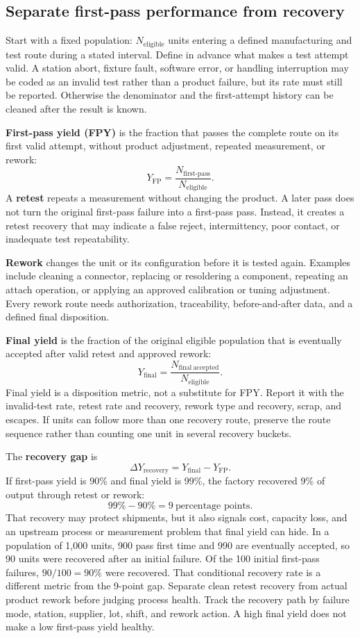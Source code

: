 \subsection{Separate first-pass performance from recovery}
\label{sec:yield-recovery-accounting}

Start with a fixed population: \(N_{\mathrm{eligible}}\) units entering a
defined manufacturing and test route during a stated interval. Define in
advance what makes a test attempt valid. A station abort, fixture fault,
software error, or handling interruption may be coded as an invalid test rather
than a product failure, but its rate must still be reported. Otherwise the
denominator and the first-attempt history can be cleaned after the result is
known.

\textbf{First-pass yield (FPY)} is the fraction that passes the complete route
on its first valid attempt, without product adjustment, repeated measurement,
or rework:
\[
Y_{\mathrm{FP}} =
\frac{N_{\mathrm{first\mbox{-}pass}}}{N_{\mathrm{eligible}}}.
\]
A \textbf{retest} repeats a measurement without changing the product. A later
pass does not turn the original first-pass failure into a first-pass pass.
Instead, it creates a retest recovery that may indicate a false reject,
intermittency, poor contact, or inadequate test repeatability.

\textbf{Rework} changes the unit or its configuration before it is tested
again. Examples include cleaning a connector, replacing or resoldering a
component, repeating an attach operation, or applying an approved calibration
or tuning adjustment. Every rework route needs authorization, traceability,
before-and-after data, and a defined final disposition.

\textbf{Final yield} is the fraction of the original eligible population that
is eventually accepted after valid retest and approved rework:
\[
Y_{\mathrm{final}} =
\frac{N_{\mathrm{final\ accepted}}}{N_{\mathrm{eligible}}}.
\]
Final yield is a disposition metric, not a substitute for FPY. Report it with
the invalid-test rate, retest rate and recovery, rework type and recovery,
scrap, and escapes. If units can follow more than one recovery route, preserve
the route sequence rather than counting one unit in several recovery buckets.

The \textbf{recovery gap} is
\[
\Delta Y_{\mathrm{recovery}} =
Y_{\mathrm{final}}-Y_{\mathrm{FP}}.
\]
If first-pass yield is 90\% and final yield is 99\%, the factory recovered 9\% of
output through retest or rework:
\[
99\%-90\%=9\ \text{percentage points}.
\]
That recovery may protect shipments, but it also signals cost, capacity loss,
and an upstream process or measurement problem that final yield can hide. In a
population of 1,000 units, 900 pass first time and 990 are eventually accepted,
so 90 units were recovered after an initial failure. Of the 100 initial
first-pass failures, \(90/100=90\%\) were recovered. That conditional recovery
rate is a different metric from the 9-point gap. Separate clean retest recovery
from actual product rework before judging process health. Track the recovery
path by failure mode, station, supplier, lot, shift, and rework action. A high
final yield does not make a low first-pass yield healthy.

